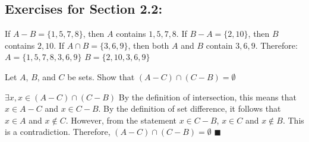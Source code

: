 \documentclass[12pt]{article}  %
\begin{document}
\subsection*{Exercises for Section 2.2:}     

\newline
{}\newline
If $A-B=\{1,5,7,8\}$, then $A$ contains $1,5,7,8$.\newline
If $B-A=\{2,10\}$, then $B$ contains $2,10$.\newline
If $A\cap B=\{3,6,9\}$, then both $A$ and $B$ contain $3,6,9$.\newline
Therefore:\newline
$A=\{1,5,7,8,3,6,9\}$\newline
$B=\{2,10,3,6,9\}$

\newline
Let $A$, $B$, and $C$ be sets. Show that $(A-C)\cap(C-B)=\emptyset$\newline

\newline
$\exists x, x\in(A-C)\cap(C-B)$\newline
By the definition of intersection, this means that $x\in A-C$ and $x\in C-B$.\newline
By the definition of set difference, it follows that $x\in A$ and $x\not\in C$. However, from the statement $x\in C-B$, $x\in C$ and $x\not\in B$. This is a contradiction.\newline
Therefore, $(A-C)\cap(C-B)=\emptyset$\newline
$\blacksquare$

\clearpage
\end{document}
